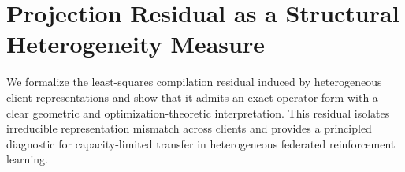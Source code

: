 











\section{Projection Residual as a Structural Heterogeneity Measure}
\label{sec:projection_residual}

We formalize the least-squares compilation residual induced by heterogeneous client representations and show that it admits an exact operator form with a clear geometric and optimization-theoretic interpretation. This residual isolates irreducible representation mismatch across clients and provides a principled diagnostic for capacity-limited transfer in heterogeneous federated reinforcement learning.


